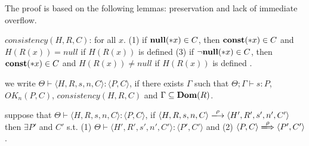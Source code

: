 The proof is based on the following lemmas: preservation and lack of
immediate overflow.

\begin{myDef}
\label{df:Rdu}
\(consistency(H, R, C)\): for all \(x\). (1) if \({\bf null}(*x) \in C\), then \(\mathbf{const}(*x) \in C \) and \(H(R(x)) = null\) if \(H(R(x))\) is defined (3) if \(\neg{\bf null}(*x) \in C\), then \(\mathbf{const}(*x) \in C\) and \(H(R(x)) \neq null\) if \(H(R(x))\) is defined .
\end{myDef}

\begin{myDef}
  \label{df:Rdu}
  we write \( \Theta \vdash \langle H, R, s, n, C \rangle : \langle P,
  C \rangle\), if there exists \(\Gamma\) such that \(\Theta; \Gamma \vdash s : P\), \(OK_n(P, C)\), \(consistency(H, R, C)\) and \(\Gamma \subseteq \mathbf{Dom}(R)\).
\end{myDef}

 
\begin{lemma}[Preservation]
\label{lem:preservation}
suppose that \( \Theta \vdash \langle H, R, s, n, C \rangle : \langle
P, C \rangle\), if \( \langle H, R, s, n, C \rangle
\xlongrightarrow{\rho} \langle H', R', s', n', C' \rangle\) then
\(\exists P'\) and \(C'\) s.t. (1) \( \Theta \vdash
\langle H', R', s', n', C' \rangle : \langle P', C' \rangle\) and (2)
\(\langle P, C \rangle \xLongrightarrow{\rho} \langle P', C'\rangle
\).
\end{lemma}


